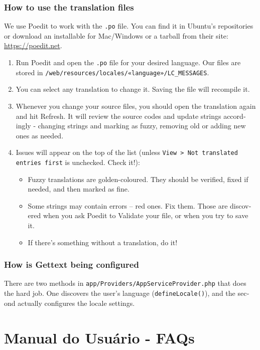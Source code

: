 \documentclass[12pt,a4paper,twoside,hyphens,english,brazil]{abntex2}
\begin{document}
{\begin{otherlanguage}{english}
\subsection{How to use the translation files}
We use Poedit to work with the \texttt{.po} file. You can find it in Ubuntu's repositories or download an installable for Mac/Windows or a tarball from their site: \url{https://poedit.net}.

\begin{enumerate}
	\item Run Poedit and open the \texttt{.po} file for your desired language. Our files are stored in \texttt{/web/resources/locales/«language»/LC\_MESSAGES}.
	\item You can select any translation to change it. Saving the file will recompile it.
	\item Whenever you change your source files, you should open the translation again and hit Refresh. It will review the source codes and update strings accordingly - changing strings and marking as fuzzy, removing old or adding new ones as needed.
	\item Issues will appear on the top of the list (unless \texttt{View > Not translated entries first} is unchecked. Check it!):
		\begin{itemize}
			\item Fuzzy translations are golden-coloured. They should be verified, fixed if needed, and then marked as fine.
			\item Some strings may contain errors -- red ones. Fix them. Those are discovered when you ask Poedit to Validate your file, or when you try to save it.
			\item If there's something without a translation, do it!
   		\end{itemize}
\end{enumerate}

\subsection{How is Gettext being configured}
There are two methods in \texttt{app/Providers/AppServiceProvider.php} that does the hard job. One discovers the user's language (\texttt{defineLocale()}), and the second actually configures the locale settings.

\end{otherlanguage}

\chapter{Manual do Usuário - FAQs} \label{apend:usuario}
\renewcommand{\subsectionautorefname}{FAQ}

}
\end{document}
